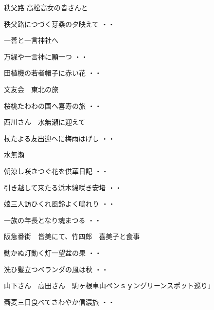 秩父路 高松高女の皆さんと
\begin{shiika}秩父路につづく芽桑の夕映えて
\hfill{・・}\end{shiika}
\vspace{ 0.4cm}
一善と一言神社へ
\begin{shiika}万緑や一言神に願一つ
\hfill{・・}\end{shiika}
\begin{shiika}田植機の若者帽子に赤い花
\hfill{・・}\end{shiika}
\vspace{ 0.4cm}
文友会　東北の旅
\begin{shiika}桜桃たわわの国へ喜寿の旅
\hfill{・・}\end{shiika}
\vspace{ 0.4cm}
西川さん　水無瀬に迎えて
\begin{shiika}杖たよる友出迎へに梅雨はげし
\hfill{・・}\end{shiika}
\vspace{ 0.4cm}
水無瀬
\begin{shiika}朝涼し咲きつぐ花を供華日記
\hfill{・・}\end{shiika}
\begin{shiika}引き越して来たる浜木綿咲き安堵
\hfill{・・}\end{shiika}
\begin{shiika}娘三人訪ひくれ風鈴よく鳴れり
\hfill{・・}\end{shiika}
\begin{shiika}一族の年長となり魂まつる
\hfill{・・}\end{shiika}
\vspace{ 0.4cm}
阪急番街　皆美にて、竹四郎　喜美子と食事
\begin{shiika}動かぬ灯動く灯一望盆の果
\hfill{・・}\end{shiika}
\begin{shiika}洗ひ髪立つベランダの風は秋
\hfill{・・}\end{shiika}
\vspace{ 0.4cm}
山下さん　高田さん　駒ヶ根車山ペンｓｙングリーンスポット巡り」
\begin{shiika}蕎麦三日食べてさわやか信濃旅
\hfill{・・}\end{shiika}

